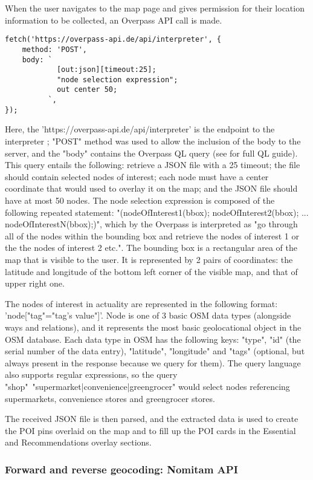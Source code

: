 When the user navigates to the map page and gives permission for their location information to be collected, an Overpass API call is made.
\begin{verbatim} 
fetch('https://overpass-api.de/api/interpreter', {
    method: 'POST',
    body: `
            [out:json][timeout:25];
            "node selection expression";
            out center 50;
          `,
});
\end{verbatim}
Here, the 'https://overpass-api.de/api/interpreter' is the endpoint to the interpreter \cite{OverpassAPIDocsWiki}; "POST" method was used to allow the inclusion of the body to the server, and the "body" contains the Overpass QL query (see \cite{OverpassAPIQueryLanguageGuide} for full QL guide). This query entails the following: retrieve a JSON file with a 25 timeout; the file should contain selected nodes of interest; each node must have a center coordinate that would used to overlay it on the map; and the JSON file should have at most 50 nodes. The node selection expression is composed of the following repeated statement: "(nodeOfInterest1(bbox); nodeOfInterest2(bbox); ... nodeOfInterestN(bbox);)", which by the Overpass is interpreted as "go through all of the nodes within the bounding box and retrieve the nodes of interest 1 or the the nodes of interest 2 etc.". The bounding box is a rectangular area of the map that is visible to the user. It is represented by 2 pairs of coordinates: the latitude and longitude of the bottom left corner of the visible map, and that of upper right one. 

The nodes of interest in actuality are represented in the following format: 'node["tag"="tag's value"]'. Node is one of 3 basic OSM data types (alongside ways and relations), and it represents the most basic geolocational object in the OSM database. Each data type in OSM has the following keys: "type", "id" (the serial number of the data entry), "latitude", "longitude" and "tags" (optional, but always present in the response because we query for them). The query language also supports regular expressions, so the query "shop"~"supermarket|convenience|greengrocer" would select nodes referencing supermarkets, convenience stores and greengrocer stores. 

The received JSON file is then parsed, and the extracted data is used to create the POI pins overlaid on the map and to fill up the POI cards in the Essential and Recommendations overlay sections.

\subsubsection{Forward and reverse geocoding: Nomitam API}

